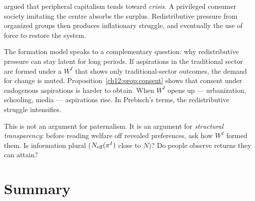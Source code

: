 \documentclass[../structural_economics_book.tex]{subfiles}
\begin{document}
\begin{prebisch}
\citet[\textit{Capitalismo perif\'{e}rico}]{prebisch1981capitalismo} argued that peripheral capitalism tends toward \textit{crisis}. A privileged consumer society imitating the centre absorbs the surplus. Redistributive pressure from organized groups then produces inflationary struggle, and eventually the use of force to restore the system.

The formation model speaks to a complementary question: why redistributive pressure can stay latent for long periods. If aspirations in the traditional sector are formed under a $W^I$ that shows only traditional-sector outcomes, the demand for change is muted. Proposition~\ref{ch12:prop:consent} shows that consent under endogenous aspirations is harder to obtain. When $W^I$ opens up --- urbanization, schooling, media --- aspirations rise. In Prebisch's terms, the redistributive struggle intensifies.

This is not an argument for paternalism. It is an argument for \textit{structural transparency}: before reading welfare off revealed preferences, ask how $W^I$ formed them. Is information plural ($N_{\text{eff}}(\pi^I)$ close to $N$)? Do people observe returns they can attain?
\end{prebisch}


\section{Summary}
\label{ch12:sec:summary}
\end{document}
